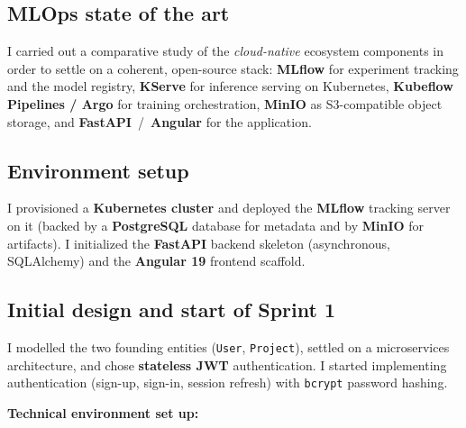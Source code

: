 \documentclass[11pt,a4paper]{article}
\begin{document}
\subsection{MLOps state of the art}
I carried out a comparative study of the \emph{cloud-native} ecosystem components
in order to settle on a coherent, open-source stack: \textbf{MLflow} for experiment
tracking and the model registry, \textbf{KServe} for inference serving on
Kubernetes, \textbf{Kubeflow Pipelines / Argo} for training orchestration,
\textbf{MinIO} as S3-compatible object storage, and \textbf{FastAPI}~/~\textbf{Angular}
for the application.

\subsection{Environment setup}
I provisioned a \textbf{Kubernetes cluster} and deployed the \textbf{MLflow}
tracking server on it (backed by a \textbf{PostgreSQL} database for metadata and by
\textbf{MinIO} for artifacts). I initialized the \textbf{FastAPI} backend skeleton
(asynchronous, SQLAlchemy) and the \textbf{Angular 19} frontend scaffold.

\subsection{Initial design and start of Sprint 1}
I modelled the two founding entities (\texttt{User}, \texttt{Project}), settled on a
microservices architecture, and chose \textbf{stateless JWT} authentication. I
started implementing authentication (sign-up, sign-in, session refresh) with
\texttt{bcrypt} password hashing.

\vspace{2pt}
\textbf{Technical environment set up:}
\vspace{0.2cm}
\end{document}
